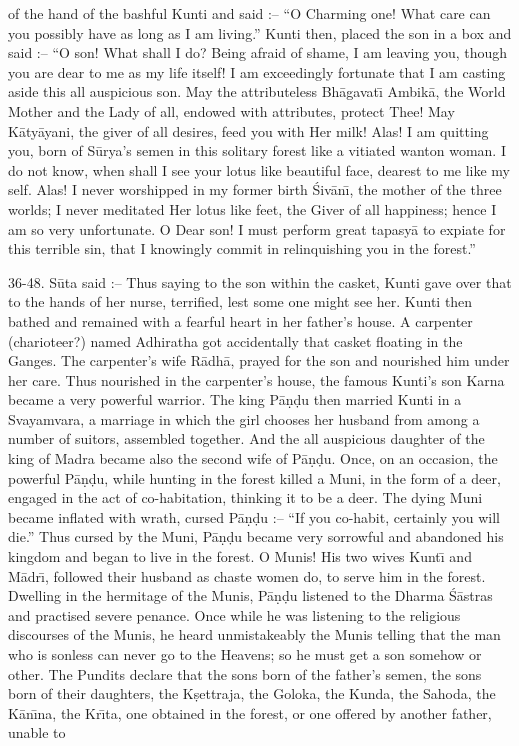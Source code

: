 of the hand of the bashful Kunti and said :-- ``O Charming one! What care can you possibly have as long as I am living.'' Kunti then, placed the son in a box and said :-- ``O son! What shall I do? Being afraid of shame, I am leaving you, though you are dear to me as my life itself! I am exceedingly fortunate that I am casting aside this all auspicious son. May the attributeless Bh\=agavat\={\i} Ambik\=a, the World Mother and the Lady of all, endowed with attributes, protect Thee! May K\=aty\=ayani, the giver of all desires, feed you with Her milk! Alas! I am quitting you, born of S\=urya's semen in this solitary forest like a vitiated wanton woman. I do not know, when shall I see your lotus like beautiful face, dearest to me like my self. Alas! I never worshipped in my former birth \'Siv\=an\={\i}, the mother of the three worlds; I never meditated Her lotus like feet, the Giver of all happiness; hence I am so very unfortunate. O Dear son! I must perform great tapasy\=a to expiate for this terrible sin, that I knowingly commit in relinquishing you in the forest.''

36-48. S\=uta said :-- Thus saying to the son within the casket, Kunti gave over that to the hands of her nurse, terrified, lest some one might see her. Kunti then bathed and remained with a fearful heart in her father's house. A carpenter (charioteer?) named Adhiratha got accidentally that casket floating in the Ganges. The carpenter's wife R\=adh\=a, prayed for the son and nourished him under her care. Thus nourished in the carpenter's house, the famous Kunti's son Karna became a very powerful warrior. The king P\=a\d{n}\d{d}u then married Kunti in a Svayamvara, a marriage in which the girl chooses her husband from among a number of suitors, assembled together. And the all auspicious daughter of the king of Madra became also the second wife of P\=a\d{n}\d{d}u. Once, on an occasion, the powerful P\=a\d{n}\d{d}u, while hunting in the forest killed a Muni, in the form of a deer, engaged in the act of co-habitation, thinking it to be a deer. The dying Muni became inflated with wrath, cursed P\=a\d{n}\d{d}u :-- ``If you co-habit, certainly you will die.'' Thus cursed by the Muni, P\=a\d{n}\d{d}u became very sorrowful and abandoned his kingdom and began to live in the forest. O Munis! His two wives Kunt\={\i} and M\=adr\={\i}, followed their husband as chaste women do, to serve him in the forest. Dwelling in the hermitage of the Munis, P\=a\d{n}\d{d}u listened to the Dharma \'S\=astras and practised severe penance. Once while he was listening to the religious discourses of the Munis, he heard unmistakeably the Munis telling that the man who is sonless can never go to the Heavens; so he must get a son somehow or other. The Pundits declare that the sons born of the father's semen, the sons born of their daughters, the K\d{s}ettraja, the Goloka, the Kunda, the Sahoda, the K\=an\={\i}na, the Kr\={\i}ta, one obtained in the forest, or one offered by another father, unable to


